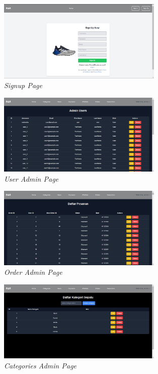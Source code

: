 \documentclass[journal,article,submit,pdftex,moreauthors]{Definitions/mdpi}
\begin{document}
\begin{figure}[H]
    \centering
    \includegraphics[width=0.7\textwidth]{images/signupPage.jpeg}
    \captionsetup{justification=centering}
    \caption{\textit{Signup Page}}
    \label{fig:activity-login}
\end{figure}
\begin{figure}[H]
    \centering
    \includegraphics[width=0.7\textwidth]{images/userPageAdmin.jpeg}
    \captionsetup{justification=centering}
    \caption{\textit{User Admin Page}}
    \label{fig:activity-login}
\end{figure}
\begin{figure}[H]
    \centering
    \includegraphics[width=0.7\textwidth]{images/orderPageAdmin.jpeg}
    \captionsetup{justification=centering}
    \caption{\textit{Order Admin Page}}
    \label{fig:activity-login}
\end{figure}
\begin{figure}[H]
    \centering
    \includegraphics[width=0.7\textwidth]{images/categoriesPageAdmin.jpeg}
    \captionsetup{justification=centering}
    \caption{\textit{Categories Admin Page}}
    \label{fig:activity-login}
\end{figure}
\end{document}
